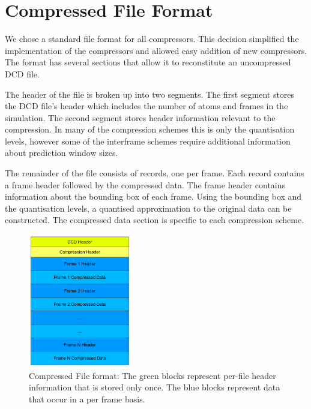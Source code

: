 \documentclass[a4paper,11pt]{report}
\begin{document}

\section{Compressed File Format}

We chose a standard file format for all compressors. This decision simplified the implementation of the compressors and allowed easy addition of new compressors. The format has several sections that allow it to reconstitute an uncompressed DCD file.

The header of the file is broken up into two segments. The first segment stores the DCD file's header which includes the number of atoms and frames in the simulation. The second segment stores header information relevant to the compression. In many of the compression schemes this is only the quantisation levels, however some of the interframe schemes require additional information about prediction window sizes.

The remainder of the file consists of records, one per frame. Each record contains a frame header followed by the compressed data. The frame header contains information about the bounding box of each frame. Using the bounding box and the quantisation levels, a quantised approximation to the original data can be constructed. The compressed data section is specific to each compression scheme.

\begin{figure}
 \center
 \includegraphics[width=0.4\textwidth]{resources/FileFormat.png}
\caption{Compressed File format: The green blocks represent per-file header information that is stored only once. The blue blocks represent data that occur in a per frame basis.}
\label{fileformat}
\end{figure}
\end{document}
